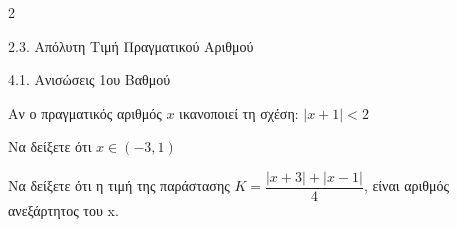 \begin{ylh}{2}
    \item 2.3. Απόλυτη Τιμή Πραγματικού Αριθμού
    \item 4.1. Ανισώσεις 1ου Βαθμού
\end{ylh}
Αν ο πραγματικός αριθμός $x$ ικανοποιεί τη σχέση: $|x + 1| < 2$

\begin{alist}
\item Να δείξετε ότι $x \in (-3, 1)$
\item Να δείξετε ότι η τιμή της παράστασης $K = \dfrac{|x + 3| + |x - 1|}{4}$, είναι αριθμός ανεξάρτητος του x.
\end{alist}

